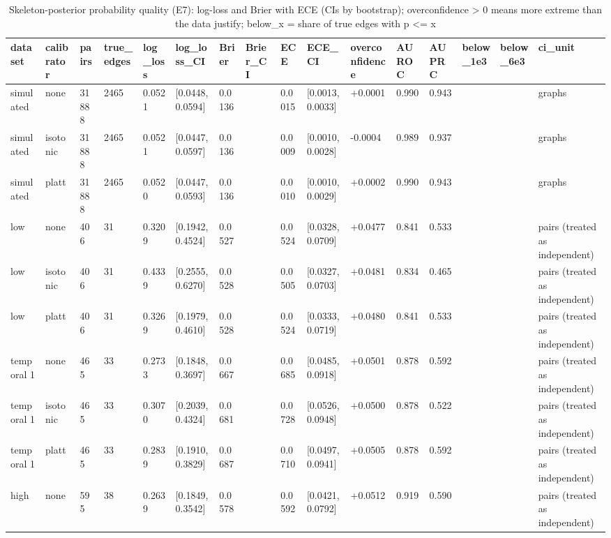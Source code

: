 \begin{table}[t]
\centering\footnotesize
\caption{Skeleton-posterior probability quality (E7): log-loss and Brier with ECE (CIs by bootstrap); overconfidence > 0 means more extreme than the data justify; below\_x = share of true edges with p <= x}\label{tab:T7_posterior_quality}
\begin{tabular}{@{}llllllllllllllll@{}}
\toprule
dataset & calibrator & pairs & true\_edges & log\_loss & log\_loss\_CI & Brier & Brier\_CI & ECE & ECE\_CI & overconfidence & AUROC & AUPRC & below\_1e3 & below\_6e3 & ci\_unit\\
\midrule
simulated & none & 31888 & 2465 & 0.0521 & [0.0448, 0.0594] & 0.0136 &  & 0.0015 & [0.0013, 0.0033] & +0.0001 & 0.990 & 0.943 &  &  & graphs\\
simulated & isotonic & 31888 & 2465 & 0.0521 & [0.0447, 0.0597] & 0.0136 &  & 0.0009 & [0.0010, 0.0028] & -0.0004 & 0.989 & 0.937 &  &  & graphs\\
simulated & platt & 31888 & 2465 & 0.0520 & [0.0447, 0.0593] & 0.0136 &  & 0.0010 & [0.0010, 0.0029] & +0.0002 & 0.990 & 0.943 &  &  & graphs\\
low & none & 406 & 31 & 0.3209 & [0.1942, 0.4524] & 0.0527 &  & 0.0524 & [0.0328, 0.0709] & +0.0477 & 0.841 & 0.533 &  &  & pairs (treated as independent)\\
low & isotonic & 406 & 31 & 0.4339 & [0.2555, 0.6270] & 0.0528 &  & 0.0505 & [0.0327, 0.0703] & +0.0481 & 0.834 & 0.465 &  &  & pairs (treated as independent)\\
low & platt & 406 & 31 & 0.3269 & [0.1979, 0.4610] & 0.0528 &  & 0.0524 & [0.0333, 0.0719] & +0.0480 & 0.841 & 0.533 &  &  & pairs (treated as independent)\\
temporal 1 & none & 465 & 33 & 0.2733 & [0.1848, 0.3697] & 0.0667 &  & 0.0685 & [0.0485, 0.0918] & +0.0501 & 0.878 & 0.592 &  &  & pairs (treated as independent)\\
temporal 1 & isotonic & 465 & 33 & 0.3070 & [0.2039, 0.4324] & 0.0681 &  & 0.0728 & [0.0526, 0.0948] & +0.0500 & 0.878 & 0.522 &  &  & pairs (treated as independent)\\
temporal 1 & platt & 465 & 33 & 0.2839 & [0.1910, 0.3829] & 0.0687 &  & 0.0710 & [0.0497, 0.0941] & +0.0505 & 0.878 & 0.592 &  &  & pairs (treated as independent)\\
high & none & 595 & 38 & 0.2639 & [0.1849, 0.3542] & 0.0578 &  & 0.0592 & [0.0421, 0.0792] & +0.0512 & 0.919 & 0.590 &  &  & pairs (treated as independent)\\

\end{tabular}
\end{table}
